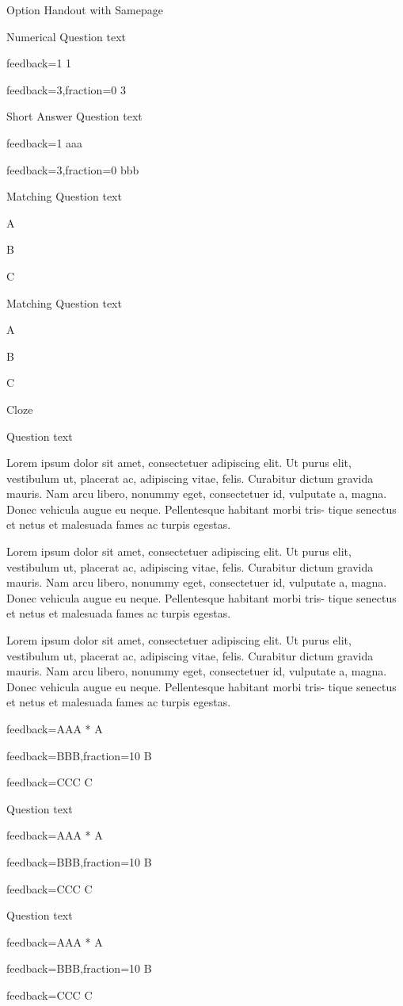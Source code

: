 \documentclass{article}
\newcommand{\longtext}{Lorem ipsum dolor sit amet, consectetuer adipiscing elit. Ut purus elit,
vestibulum ut, placerat ac, adipiscing vitae, felis. Curabitur dictum gravida
mauris. Nam arcu libero, nonummy eget, consectetuer id, vulputate a,
magna. Donec vehicula augue eu neque. Pellentesque habitant morbi tris-
tique senectus et netus et malesuada fames ac turpis egestas.}
\newcommand{\longtexts}{\longtext\par\longtext\par\longtext}
\begin{document}
\begin{quiz}[points=1,tags={tag},feedback={General feedback},shuffle]{ Option
Handout with Samepage}
\begin{numerical}[tolerance=1]{Numerical}
Question text
\item[feedback={1}] 1
\item[feedback={3},fraction=0] 3
\end{numerical}

\begin{shortanswer}[tolerance=1]{Short Answer}
Question text
\item[feedback={1}] aaa
\item[feedback={3},fraction=0] bbb
\end{shortanswer}

\begin{matching}[dd]{Matching}
Question text
\item A 
\item B 
\item C 
\item   {}
\end{matching}

\begin{matching}[shuffle=false]{Matching}
Question text
\item A 
\item B 
\item C 
\item   {}
\end{matching}

\begin{cloze}{Cloze}

\begin{multi}[horizontal,shuffle=false]
Question text

\longtexts

\item[feedback={AAA}]* A
\item[feedback={BBB},fraction=10] B
\item[feedback={CCC}] C
\end{multi}

\begin{multi}[vertical,shuffle=false]
Question text
\item[feedback={AAA}]* A
\item[feedback={BBB},fraction=10] B
\item[feedback={CCC}] C
\end{multi}

\begin{multi}[inline,shuffle=false]
Question text
\item[feedback={AAA}]* A
\item[feedback={BBB},fraction=10] B
\item[feedback={CCC}] C
\end{multi}


\end{cloze}
\end{quiz}
\end{document}
